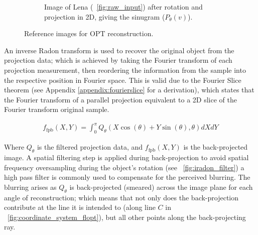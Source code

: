 \begin{figure}
\begin{subfigure}[t]{0.3\textwidth}
    \caption{Image of Lena (\figurename~\ref{fig:raw_input}) after rotation and projection in 2D, giving the sinugram (\(P_{\theta}(v)\)).}
    \label{fig:sinugram_stretch}
  \end{subfigure}
    \hfill
  \label{fig:rawinputs}
  \caption{Reference images for OPT reconstruction.}
  \label{fig:rawinputs}
\end{figure}


An inverse \gls{Radon transform} is used to recover the original object from the projection data; which is achieved by taking the \gls{Fourier transform} of each projection measurement, then reordering the information from the sample into the respective position in Fourier space.
This is valid due to the Fourier Slice theorem (see Appendix \ref{appendix:fourierslice} for a derivation)\cite{Fourier slice theorem}, %
which states that the \gls{Fourier transform} of a parallel projection equivalent to a 2D slice of the Fourier transform original sample.


\begin{align}
f_{\text{fpb}}(X,Y) = \int_{0}^{\pi} Q_\theta (X\cos(\theta)+Y\sin(\theta),\theta)dXdY
\end{align}

Where $Q_\theta$ is the filtered projection data, and $f_{\text{fpb}}(X,Y)$ is the back-projected image.
A spatial filtering step is applied during back-projection to avoid spatial frequency oversampling during the object’s rotation (see \figurename~\ref{fig:iradon_filter}) %
a high pass filter is commonly used to compensate for the perceived blurring.
The blurring arises as \(Q_\theta\) is back-projected (smeared) across the \gls{image plane} for each angle of reconstruction; which means that not only does the back-projection contribute at the line it is intended to (along line \(C\) in \figurename~\ref{fig:coordinate_system_flopt}), but all other points along the back-projecting ray.

